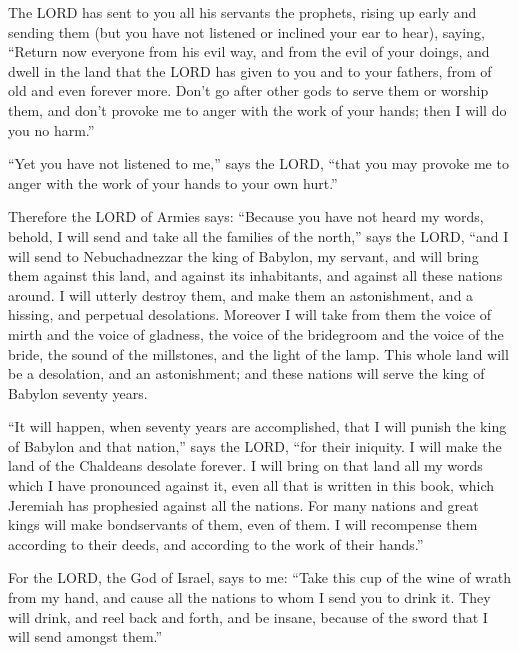  The LORD has sent to you all his servants the prophets,
rising up early and sending them (but you have not listened or inclined
your ear to hear),  saying, ``Return now everyone from his
evil way, and from the evil of your doings, and dwell in the land that
the LORD has given to you and to your fathers, from of old and even
forever more.  Don't go after other gods to serve them or
worship them, and don't provoke me to anger with the work of your hands;
then I will do you no harm.''

 ``Yet you have not listened to me,'' says the LORD, ``that
you may provoke me to anger with the work of your hands to your own
hurt.''

 Therefore the LORD of Armies says: ``Because you have not
heard my words,  behold, I will send and take all the
families of the north,'' says the LORD, ``and I will send to
Nebuchadnezzar the king of Babylon, my servant, and will bring them
against this land, and against its inhabitants, and against all these
nations around. I will utterly destroy them, and make them an
astonishment, and a hissing, and perpetual desolations. 
Moreover I will take from them the voice of mirth and the voice of
gladness, the voice of the bridegroom and the voice of the bride, the
sound of the millstones, and the light of the lamp.  This
whole land will be a desolation, and an astonishment; and these nations
will serve the king of Babylon seventy years.

 ``It will happen, when seventy years are accomplished,
that I will punish the king of Babylon and that nation,'' says the LORD,
``for their iniquity. I will make the land of the Chaldeans desolate
forever.  I will bring on that land all my words which I
have pronounced against it, even all that is written in this book, which
Jeremiah has prophesied against all the nations.  For many
nations and great kings will make bondservants of them, even of them. I
will recompense them according to their deeds, and according to the work
of their hands.''

 For the LORD, the God of Israel, says to me: ``Take this
cup of the wine of wrath from my hand, and cause all the nations to whom
I send you to drink it.  They will drink, and reel back and
forth, and be insane, because of the sword that I will send amongst
them.''

